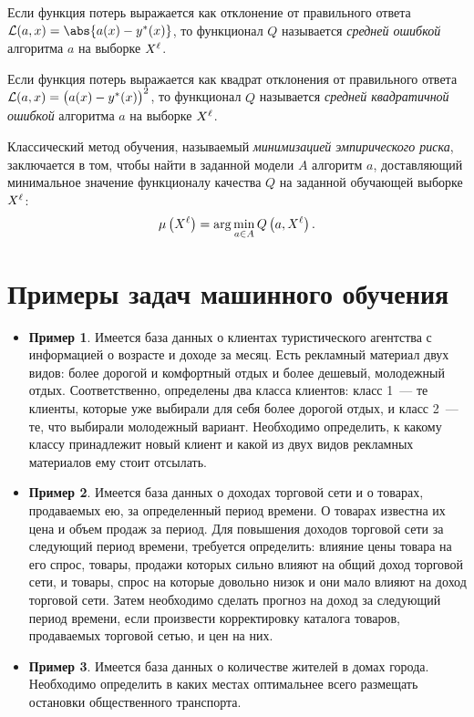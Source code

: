 Если функция потерь выражается как отклонение от правильного ответа
\( \L(a, x) = \abs{a(x) - y^*(x)} \), то функционал \( Q \) называется \emph{средней ошибкой} алгоритма
\( a \) на выборке \( X^\ell \).

Если функция потерь выражается как квадрат отклонения от правильного ответа
\( \mathcal{L}(a, x) = \bigl(a(x) - y^*(x)\bigr)^2 \), то функционал \( Q \) называется
\emph{средней квадратичной ошибкой} алгоритма \( a \) на выборке \( X^\ell \).

Классический метод обучения, называемый \emph{минимизацией эмпирического риска}, заключается в том,
чтобы найти в заданной модели \( A \) алгоритм \( a \), доставляющий минимальное значение функционалу
качества \( Q \) на заданной обучающей выборке \( X^\ell \):
\begin{equation}
  \mu\left(X^\ell\right) = \arg\min_{a\in A} Q\left(a, X^\ell\right).
  \label{eq:2}
\end{equation}

\section{Примеры задач машинного обучения}
\begin{itemize}
  \item[] \textbf{Пример 1}. Имеется база данных о клиентах туристического
    агентства с информацией о возрасте и доходе за месяц. Есть рекламный материал двух видов: более
    дорогой и комфортный отдых и более дешевый, молодежный отдых. Соответственно, определены два класса
    клиентов: класс 1~--- те клиенты, которые уже выбирали для себя более дорогой отдых, и класс 2~---
    те, что выбирали молодежный вариант.
    Необходимо определить, к какому классу принадлежит новый клиент и какой из двух видов рекламных
    материалов ему стоит отсылать.
  \item[] \textbf{Пример 2}. Имеется база данных о доходах торговой сети и о товарах, продаваемых ею, за
  определенный период времени. О товарах известна их цена и объем продаж за период. Для повышения доходов
  торговой сети за следующий период времени, требуется определить: влияние цены товара на его спрос,
  товары, продажи которых сильно влияют на общий доход   торговой сети, и товары, спрос на которые
  довольно низок и они мало влияют на доход торговой сети. Затем необходимо сделать прогноз на доход за
  следующий период времени, если произвести корректировку   каталога товаров, продаваемых торговой сетью,
  и цен на них.
  \item[] \textbf{Пример 3}. Имеется база данных о количестве жителей в домах города. Необходимо определить
  в каких местах оптимальнее всего размещать остановки общественного транспорта.
\end{itemize}

